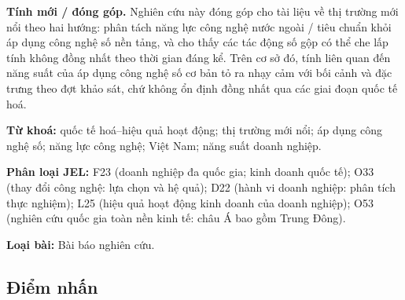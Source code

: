 \documentclass[12pt,a4paper]{article}
\begin{document}
\textbf{Tính mới / đóng góp.} Nghiên cứu này đóng góp cho tài liệu về
thị trường mới nổi theo hai hướng: phân tách năng lực công nghệ nước
ngoài / tiêu chuẩn khỏi áp dụng công nghệ số nền tảng, và cho thấy các
tác động số gộp có thể che lấp tính không đồng nhất theo thời gian đáng
kể. Trên cơ sở đó, tính liên quan đến năng suất của áp dụng công nghệ số
cơ bản tỏ ra nhạy cảm với bối cảnh và đặc trưng theo đợt khảo sát, chứ
không ổn định đồng nhất qua các giai đoạn quốc tế hoá.

\textbf{Từ khoá:} quốc tế hoá--hiệu quả hoạt động; thị trường mới nổi;
áp dụng công nghệ số; năng lực công nghệ; Việt Nam; năng suất doanh
nghiệp.

\textbf{Phân loại JEL:} F23 (doanh nghiệp đa quốc gia; kinh doanh quốc
tế); O33 (thay đổi công nghệ: lựa chọn và hệ quả); D22 (hành vi doanh
nghiệp: phân tích thực nghiệm); L25 (hiệu quả hoạt động kinh doanh của
doanh nghiệp); O53 (nghiên cứu quốc gia toàn nền kinh tế: châu Á bao gồm
Trung Đông).

\textbf{Loại bài:} Bài báo nghiên cứu.

\hypertarget{ux111iux1ec3m-nhux1ea5n}{%
\subsection{Điểm nhấn}\label{ux111iux1ec3m-nhux1ea5n}}
\end{document}
